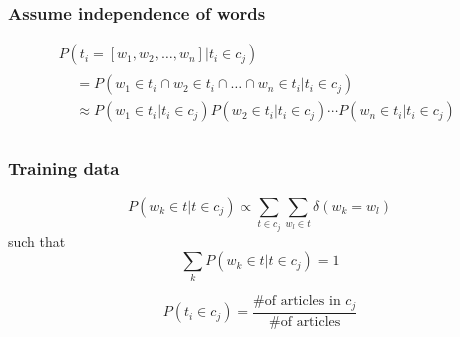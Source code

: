 \documentclass{beamer}
\begin{document}
\begin{frame}
\frametitle{Assume independence of words}

\begin{multline*}
P(t_i = [w_1, w_2, \dots, w_n] | t_i \in c_j) \\
\begin{aligned}
& = P(w_1 \in t_i \cap w_2 \in t_i \cap \dots \cap w_n \in t_i | t_i \in c_j) \\
& \approx P(w_1 \in t_i | t_i \in c_j) P(w_2 \in t_i | t_i \in c_j) \cdots P(w_n
\in t_i | t_i \in c_j) \\
\end{aligned}
\end{multline*}

\end{frame}

\begin{frame}
\frametitle{Training data}

\[P(w_k \in t | t \in c_j) \propto \displaystyle \sum_{t \in c_j} \sum_{w_l \in t}
    \delta (w_k = w_l)\]
such that
\[\displaystyle \sum_k P(w_k \in t | t \in c_j) = 1\]

\vspace{2em}

\[P(t_i \in c_j) = \frac{\text{\# of articles in } c_j}{\text{\# of articles}}\]

\end{frame}
\end{document}
